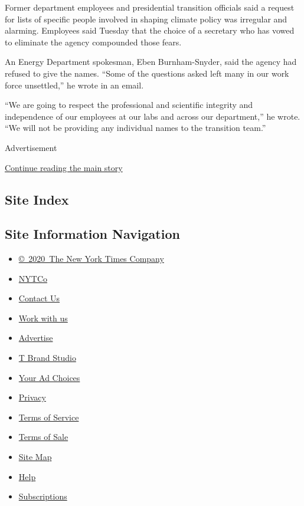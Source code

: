 Former department employees and presidential transition officials said a
request for lists of specific people involved in shaping climate policy
was irregular and alarming. Employees said Tuesday that the choice of a
secretary who has vowed to eliminate the agency compounded those fears.

An Energy Department spokesman, Eben Burnham-Snyder, said the agency had
refused to give the names. ``Some of the questions asked left many in
our work force unsettled,'' he wrote in an email.

``We are going to respect the professional and scientific integrity and
independence of our employees at our labs and across our department,''
he wrote. ``We will not be providing any individual names to the
transition team.''

Advertisement

\protect\hyperlink{after-bottom}{Continue reading the main story}

\hypertarget{site-index}{%
\subsection{Site Index}\label{site-index}}

\hypertarget{site-information-navigation}{%
\subsection{Site Information
Navigation}\label{site-information-navigation}}

\begin{itemize}
\tightlist
\item
  \href{https://help.nytimes.com/hc/en-us/articles/115014792127-Copyright-notice}{©~2020~The
  New York Times Company}
\end{itemize}

\begin{itemize}
\tightlist
\item
  \href{https://www.nytco.com/}{NYTCo}
\item
  \href{https://help.nytimes.com/hc/en-us/articles/115015385887-Contact-Us}{Contact
  Us}
\item
  \href{https://www.nytco.com/careers/}{Work with us}
\item
  \href{https://nytmediakit.com/}{Advertise}
\item
  \href{http://www.tbrandstudio.com/}{T Brand Studio}
\item
  \href{https://www.nytimes.com/privacy/cookie-policy\#how-do-i-manage-trackers}{Your
  Ad Choices}
\item
  \href{https://www.nytimes.com/privacy}{Privacy}
\item
  \href{https://help.nytimes.com/hc/en-us/articles/115014893428-Terms-of-service}{Terms
  of Service}
\item
  \href{https://help.nytimes.com/hc/en-us/articles/115014893968-Terms-of-sale}{Terms
  of Sale}
\item
  \href{https://spiderbites.nytimes.com}{Site Map}
\item
  \href{https://help.nytimes.com/hc/en-us}{Help}
\item
  \href{https://www.nytimes.com/subscription?campaignId=37WXW}{Subscriptions}
\end{itemize}
